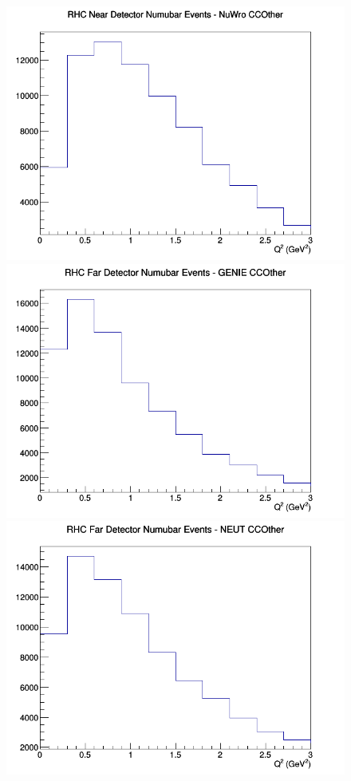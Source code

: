 \documentclass[12pt]{article}
\begin{document}
\begin{figure}[h]
\includegraphics[width=\linewidth]{Q2/nominal/CCOther_RHC_ND_numubar_Q2_NuWro.png}
\endminipage
\newline
{}
\includegraphics[width=\linewidth]{Q2/nominal/CCOther_RHC_FD_numubar_Q2_GENIE.png}
\endminipage
{}
\includegraphics[width=\linewidth]{Q2/nominal/CCOther_RHC_FD_numubar_Q2_NEUT.png}

\end{figure}
\end{document}

